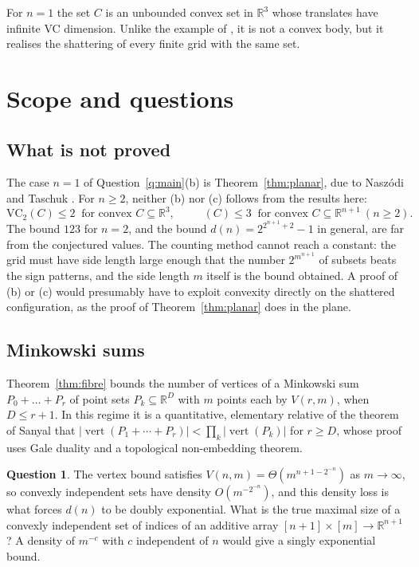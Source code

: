 \documentclass[11pt,a4paper]{article}
\theoremstyle{plain}
\theoremstyle{definition}
\newtheorem{question}[theorem]{Question}
\DeclareMathOperator{\vertt}{vert}
\DeclareMathOperator{\VCn}{\mathrm{VC}_n}
\newcommand{\R}{\mathbb{R}}
\begin{document}
For $n=1$ the set $C$ is an unbounded convex set in $\R^{3}$ whose translates have infinite VC
dimension. Unlike the example of \cite{naszoditaschuk}, it is not a convex body, but it realises
the shattering of every finite grid with the same set.

\section{Scope and questions}\label{sec:status}

\subsection{What is not proved}

The case $n=1$ of Question~\ref{q:main}(b) is Theorem~\ref{thm:planar}, due to Naszódi and
Taschuk \cite{naszoditaschuk}. For $n\ge2$, neither (b) nor (c) follows from the results here:
\[
  \mathrm{VC}_2(C)\le2\ \text{ for convex } C\subseteq\R^{3},
  \qquad
  \VCn(C)\le3\ \text{ for convex } C\subseteq\R^{n+1}\ (n\ge2).
\]
The bound $123$ for $n=2$, and the bound $d(n)=2^{2^{n+1}+2}-1$ in general, are far from the
conjectured values. The counting method cannot reach a constant: the grid must have side length
large enough that the number $2^{m^{n+1}}$ of subsets beats the sign patterns, and the side
length $m$ itself is the bound obtained. A proof of (b) or (c) would presumably have to exploit
convexity directly on the shattered configuration, as the proof of Theorem~\ref{thm:planar}
does in the plane.

\subsection{Minkowski sums}

Theorem~\ref{thm:fibre} bounds the number of vertices of a Minkowski sum $P_0+\dots+P_r$ of
point sets $P_k\subseteq\R^{D}$ with $m$ points each by $V(r,m)$, when $D\le r+1$. In this regime
it is a quantitative, elementary relative of the theorem of Sanyal \cite{sanyal} that
$|\vertt(P_1+\cdots+P_r)|<\prod_k|\vertt(P_k)|$ for $r\ge D$, whose proof uses Gale duality and
a topological non-embedding theorem.

\begin{question}
The vertex bound satisfies $V(n,m)=\Theta(m^{n+1-2^{-n}})$ as $m\to\infty$, so convexly
independent sets have density $O(m^{-2^{-n}})$, and this density loss is what forces
$d(n)$ to be doubly exponential. What is the true maximal size of a convexly independent set of
indices of an additive array $[n+1]\times[m]\to\R^{n+1}$? A density of $m^{-c}$ with $c$
independent of $n$ would give a singly exponential bound.
\end{question}
\end{document}
